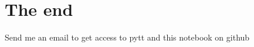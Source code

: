\documentclass[11pt]{article}
\begin{document}
    \begin{center}
    \end{center}
    { \hspace*{\fill} \\}
    
    

    \hypertarget{the-end}{%
\section{The end}\label{the-end}}

Send me an email to get access to pytt and this notebook on github


    
    
    
    
\end{document}
